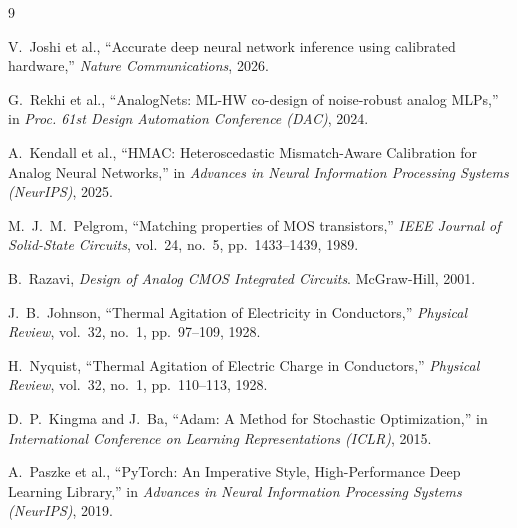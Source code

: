 \documentclass[10pt,twocolumn]{article}
\begin{document}
\begin{thebibliography}{9}

V.~Joshi et al., ``Accurate deep neural network inference using calibrated hardware,'' \textit{Nature Communications}, 2026.

G.~Rekhi et al., ``AnalogNets: ML-HW co-design of noise-robust analog MLPs,'' in \textit{Proc. 61st Design Automation Conference (DAC)}, 2024.

A.~Kendall et al., ``HMAC: Heteroscedastic Mismatch-Aware Calibration for Analog Neural Networks,'' in \textit{Advances in Neural Information Processing Systems (NeurIPS)}, 2025.

M.~J.~M.~Pelgrom, ``Matching properties of MOS transistors,'' \textit{IEEE Journal of Solid-State Circuits}, vol.~24, no.~5, pp.~1433--1439, 1989.

B.~Razavi, \textit{Design of Analog CMOS Integrated Circuits}. McGraw-Hill, 2001.

J.~B.~Johnson, ``Thermal Agitation of Electricity in Conductors,'' \textit{Physical Review}, vol.~32, no.~1, pp.~97--109, 1928.

H.~Nyquist, ``Thermal Agitation of Electric Charge in Conductors,'' \textit{Physical Review}, vol.~32, no.~1, pp.~110--113, 1928.

D.~P.~Kingma and J.~Ba, ``Adam: A Method for Stochastic Optimization,'' in \textit{International Conference on Learning Representations (ICLR)}, 2015.

A.~Paszke et al., ``PyTorch: An Imperative Style, High-Performance Deep Learning Library,'' in \textit{Advances in Neural Information Processing Systems (NeurIPS)}, 2019.

\end{thebibliography}
\end{document}
